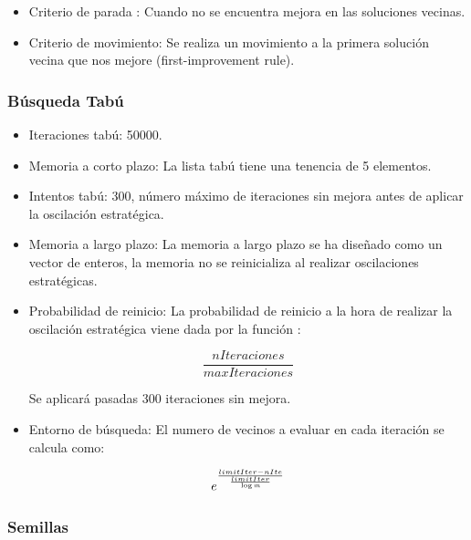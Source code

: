 \documentclass{article}
\begin{document}
	\begin{itemize}
		
		\item Criterio de parada : Cuando no se encuentra mejora en las soluciones vecinas.
		
		\item Criterio de movimiento: Se realiza un movimiento a la primera solución vecina que nos mejore (first-improvement rule).
		
	\end{itemize}
	
	
	\subsubsection{Búsqueda Tabú}
	
	\begin{itemize}
		
		\item Iteraciones tabú: 50000.
		
		\item Memoria a corto plazo: La lista tabú tiene una tenencia de 5 elementos.
		
		\item Intentos tabú: 300, número máximo de iteraciones sin mejora antes de aplicar la oscilación estratégica.
		
		\item Memoria a largo plazo: La memoria a largo plazo se ha diseñado como un vector de enteros, la memoria no se reinicializa al realizar oscilaciones estratégicas.
		
		\item Probabilidad de reinicio: La probabilidad de reinicio a la hora de realizar la oscilación estratégica viene dada por la función :
		
		\[ \frac{nIteraciones}{maxIteraciones} \]
		
		Se aplicará pasadas 300 iteraciones sin mejora.
		
		\item Entorno de búsqueda: El numero de vecinos a evaluar en cada iteración se calcula como:
		
		\[ e^{\frac{limitIter - nIte}{ \frac{limitIter}{\log{\emph{m}}}}}\]
		
	\end{itemize}
	
	\subsubsection{Semillas}
	
\end{document}
